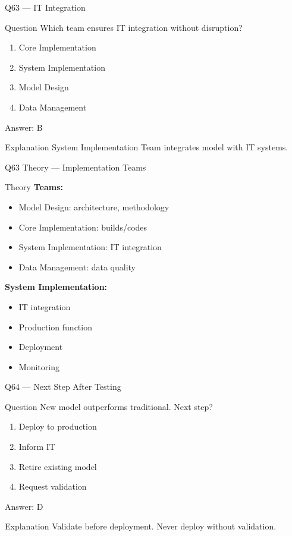 \documentclass[aspectratio=169,8pt]{beamer}
\begin{document}
	\begin{frame}{Q63 --- IT Integration}
		\begin{block}{Question}
			Which team ensures IT integration without disruption?
		\end{block}
		\begin{enumerate}[label=\Alph*.]
			\item Core Implementation
			\item System Implementation
			\item Model Design
			\item Data Management
		\end{enumerate}
		\begin{exampleblock}{Answer: B}
		\end{exampleblock}
		\begin{block}{Explanation}
			System Implementation Team integrates model with IT systems.
		\end{block}
	\end{frame}
	
	\begin{frame}{Q63 Theory --- Implementation Teams}
		\begin{block}{Theory}
			\textbf{Teams:}
			\begin{itemize}
				\item Model Design: architecture, methodology
				\item Core Implementation: builds/codes
				\item System Implementation: IT integration
				\item Data Management: data quality
			\end{itemize}
			\textbf{System Implementation:}
			\begin{itemize}
				\item IT integration
				\item Production function
				\item Deployment
				\item Monitoring
			\end{itemize}
		\end{block}
	\end{frame}
	
	\begin{frame}{Q64 --- Next Step After Testing}
		\begin{block}{Question}
			New model outperforms traditional. Next step?
		\end{block}
		\begin{enumerate}[label=\Alph*.]
			\item Deploy to production
			\item Inform IT
			\item Retire existing model
			\item Request validation
		\end{enumerate}
		\begin{exampleblock}{Answer: D}
		\end{exampleblock}
		\begin{block}{Explanation}
			Validate before deployment. Never deploy without validation.
		\end{block}
	\end{frame}
	
\end{document}
